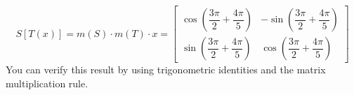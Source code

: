 \documentclass[../linear-spaces.tex]{subfiles}
\begin{document}
\begin{example}
    \begin{equation*}
            S\left[T(x)\right] = m(S)\cdot m(T) \cdot x =
            \left[\begin{matrix}
                \cos\left(\dfrac{3\pi}{2} + \dfrac{4\pi}{5}\right) & -\sin\left(\dfrac{3\pi}{2} + \dfrac{4\pi}{5}\right)\\[1.5em]
                \sin\left(\dfrac{3\pi}{2} + \dfrac{4\pi}{5}\right) & \cos\left(\dfrac{3\pi}{2} + \dfrac{4\pi}{5}\right) 
            \end{matrix}\right]
    \end{equation*}
    You can verify this result by using trigonometric identities and the matrix multiplication 
    rule.
\end{example}
\end{document}
